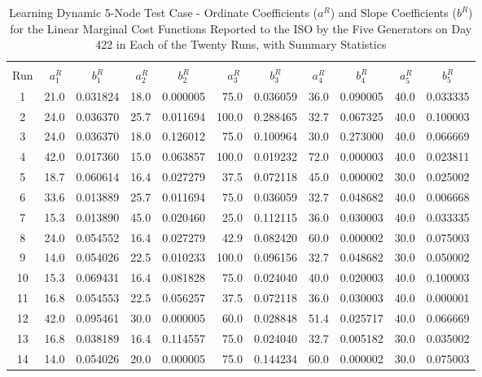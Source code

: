 \documentclass[12pt]{article}
\begin{document}
\begin{table}[h]
	\caption{Learning Dynamic 5-Node Test Case - Ordinate Coefficients ($a^R$) and Slope Coefficients ($b^R$) for the Linear Marginal Cost Functions Reported to the ISO by the Five Generators on Day 422 in Each of the Twenty Runs, with Summary Statistics} 
	\label{tab: 5Node.Learning.ReportedCostCoeffs}
\begin{minipage}{\textwidth}
	\centering
\begin{tabular}{crcrcrcccrc} 
\hline\hline \\[0.1ex]
Run & $a_1^R~$ & $b_1^R$ & $a_2^R~$ & $b_2^R$ & $a_3^R~$ & $b_3^R$ & $a_4^R$ & $b_4^R$ & $a_5^R~$ & $b_5^R$ \\
\hline
1	&	21.0	&	0.031824	&	18.0	&	0.000005	&	75.0	&	0.036059	&	36.0	&	0.090005	&	40.0	&	0.033335	\\
2	&	24.0	&	0.036370	&	25.7	&	0.011694	&	100.0	&	0.288465	&	32.7	&	0.067325	&	40.0	&	0.100003	\\
3	&	24.0	&	0.036370	&	18.0	&	0.126012	&	75.0	&	0.100964	&	30.0	&	0.273000	&	40.0	&	0.066669	\\
4	&	42.0	&	0.017360	&	15.0	&	0.063857	&	100.0	&	0.019232	&	72.0	&	0.000003	&	40.0	&	0.023811	\\
5	&	18.7	&	0.060614	&	16.4	&	0.027279	&	37.5	&	0.072118	&	45.0	&	0.000002	&	30.0	&	0.025002	\\
6	&	33.6	&	0.013889	&	25.7	&	0.011694	&	75.0	&	0.036059	&	32.7	&	0.048682	&	40.0	&	0.006668	\\
7	&	15.3	&	0.013890	&	45.0	&	0.020460	&	25.0	&	0.112115	&	36.0	&	0.030003	&	40.0	&	0.033335	\\
8	&	24.0	&	0.054552	&	16.4	&	0.027279	&	42.9	&	0.082420	&	60.0	&	0.000002	&	30.0	&	0.075003	\\
9	&	14.0	&	0.054026	&	22.5	&	0.010233	&	100.0	&	0.096156	&	32.7	&	0.048682	&	30.0	&	0.050002	\\
10	&	15.3	&	0.069431	&	16.4	&	0.081828	&	75.0	&	0.024040	&	40.0	&	0.020003	&	40.0	&	0.100003	\\
11	&	16.8	&	0.054553	&	22.5	&	0.056257	&	37.5	&	0.072118	&	36.0	&	0.030003	&	40.0	&	0.000001	\\
12	&	42.0	&	0.095461	&	30.0	&	0.000005	&	60.0	&	0.028848	&	51.4	&	0.025717	&	40.0	&	0.066669	\\
13	&	16.8	&	0.038189	&	16.4	&	0.114557	&	75.0	&	0.024040	&	32.7	&	0.005182	&	30.0	&	0.035002	\\
14	&	14.0	&	0.054026	&	20.0	&	0.000005	&	75.0	&	0.144234	&	60.0	&	0.000002	&	30.0	&	0.075003	\\

\end{tabular}
\end{minipage}
\end{table}
\end{document}
